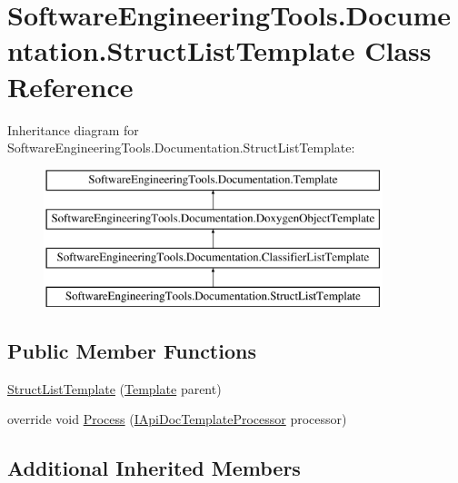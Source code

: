 \hypertarget{class_software_engineering_tools_1_1_documentation_1_1_struct_list_template}{\section{Software\+Engineering\+Tools.\+Documentation.\+Struct\+List\+Template Class Reference}
\label{class_software_engineering_tools_1_1_documentation_1_1_struct_list_template}
}
Inheritance diagram for Software\+Engineering\+Tools.\+Documentation.\+Struct\+List\+Template\+:\begin{figure}[H]
\begin{center}
\leavevmode
\includegraphics[height=4.000000cm]{class_software_engineering_tools_1_1_documentation_1_1_struct_list_template}
\end{center}
\end{figure}
\subsection*{Public Member Functions}
\begin{DoxyCompactItemize}
\item 
\hyperlink{class_software_engineering_tools_1_1_documentation_1_1_struct_list_template_aae3b2571a51d5baa95da7fcaf60a57ca}{Struct\+List\+Template} (\hyperlink{class_software_engineering_tools_1_1_documentation_1_1_template}{Template} parent)
\item 
override void \hyperlink{class_software_engineering_tools_1_1_documentation_1_1_struct_list_template_ae89463eba79df4d331672e9774a65885}{Process} (\hyperlink{interface_software_engineering_tools_1_1_documentation_1_1_i_api_doc_template_processor}{I\+Api\+Doc\+Template\+Processor} processor)
\end{DoxyCompactItemize}
\subsection*{Additional Inherited Members}


